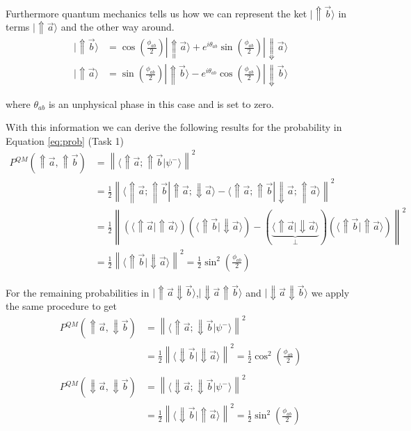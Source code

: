 \documentclass[a4paper]{article}
\begin{document}
Furthermore quantum mechanics tells us how we can represent the ket
$|\Uparrow \vec{b}\rangle$ in terms $|\Uparrow \vec{a}\rangle$ and the other
way around.
\begin{align}
    |\Uparrow \vec{b}\rangle &= \cos(\frac{\phi_{ab}}{2})|\Uparrow
    \vec{a}\rangle + e^{i\theta_{ab}} \sin(\frac{\phi_{ab}}{2})|\Downarrow
    \vec{a}\rangle\\
    |\Uparrow \vec{a}\rangle &= \sin(\frac{\phi_{ab}}{2})|\Uparrow
    \vec{b}\rangle - e^{i\theta_{ab}} \cos(\frac{\phi_{ab}}{2})|\Downarrow
    \vec{b}\rangle
\end{align}

where $\theta_{ab}$ is an unphysical phase in this case and is set to zero.

With this information we can derive the following results for the
probability in Equation \ref{eq:prob} (Task 1)
\begin{align}
    P^{QM}(\Uparrow \vec{a}, \Uparrow \vec{b}) &= \left\|\langle\Uparrow \vec{a}; \Uparrow
    \vec{b}|\psi ^-\rangle \right\|^2 \\
    &=\frac{1}{2} \left\|\langle\Uparrow \vec{a}; \Uparrow \vec{b}|\Uparrow
    \vec{a}; \Downarrow \vec{a}\rangle - \langle \Uparrow \vec{a}; \Uparrow
    \vec{b}| \Downarrow \vec{a}; \Uparrow \vec{a}\rangle\right\|^2 \\
    &= \frac{1}{2}\left\|(\langle\Uparrow \vec{a}|\Uparrow\vec{a}\rangle)
    (\langle\Uparrow \vec{b}| \Downarrow \vec{a}\rangle) - (\underbrace{\langle\Uparrow
    \vec{a}| \Downarrow \vec{a}\rangle}_{\bot})(\langle\Uparrow \vec{b}|
    \Uparrow\vec{a}\rangle)\right\|^2 \\
    &=\frac{1}{2}\left\|\langle\Uparrow\vec{b}|\Downarrow\vec{a}\rangle\right\|^2
    =\frac{1}{2}\sin^2(\frac{\phi_{ab}}{2})
\end{align}

For the remaining probabilities in $|\Uparrow \vec{a}\Downarrow \vec{b}\rangle$,$|\Downarrow
\vec{a}\Uparrow\vec{b}\rangle$ and $|\Downarrow\vec{a}\Downarrow\vec{b} \rangle$
we apply the same procedure to get
\begin{align}
    P^{QM}(\Uparrow \vec{a}, \Downarrow \vec{b}) &= \left\|\langle\Uparrow
    \vec{a}; \Downarrow \vec{b}|\psi^- \rangle\right\|^2 \\
    &=\frac{1}{2}\left\|\langle\Downarrow \vec{b}|\Downarrow
    \vec{a}\rangle\right\|^2 = \frac{1}{2}\cos^2(\frac{\phi_{ab}}{2})\\
    \\
    P^{QM}(\Downarrow \vec{a}, \Downarrow \vec{b}) &= \left\|\langle\Downarrow
    \vec{a}; \Downarrow \vec{b}|\psi^- \rangle\right\|^2 \\
    &=\frac{1}{2}\left\|\langle\Downarrow \vec{b}|\Uparrow
    \vec{a}\rangle\right\|^2 = \frac{1}{2}\sin^2(\frac{\phi_{ab}}{2})
\end{align}
\end{document}
